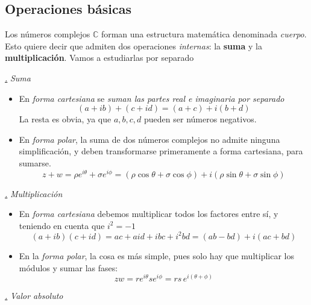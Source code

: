 \documentclass[a4paper,11pt]{book} %
\numberwithin{equation}{chapter}
\def\subsubiContadorIt{\par\addtocounter{subsubsection}{1}\underline{\it\thesubsubsection.}\hskip0.5cm \setcounter{subsubsubsectionIt}{0}}
\newcommand{\SubsubiIt}[1]{
		\subsubiContadorIt \textit{#1}
	}
\newcounter{subsubsubsectionIt}[subsubsection]
\begin{document}
			
		\subsection{Operaciones básicas}

Los números complejos ${\mathbb C}$ forman una estructura matemática denominada \textit{cuerpo}. Esto  quiere decir que admiten dos operaciones \textit{internas}: la \textbf{suma} y la \textbf{multiplicación}. Vamos a estudiarlas por separado


			\SubsubiIt{Suma}

\begin{itemize}
	\item En \textit{forma cartesiana} se \textit{suman las partes real e imaginaria por separado}
	\begin{equation}
(a + i b) + (c + i d) = (a+c) + i (b+d)
	\end{equation} 
La resta es obvia, ya que $a,b,c,d$ pueden ser números negativos. 	

	\item En  \textit{forma polar}, la suma de dos números complejos no admite ninguna simplificación, y deben transformarse primeramente a forma cartesiana, para sumarse. 
	\begin{equation}
z + w = \rho e^{i\theta} + \sigma e^{i\phi} = (\rho\cos\theta + \sigma\cos\phi) + i(\rho\sin\theta +  \sigma\sin\phi) 
	\end{equation}	
\end{itemize}
			
			\SubsubiIt{Multiplicación}

\begin{itemize}
	\item En \textit{forma cartesiana} debemos multiplicar todos los factores entre sí, y teniendo en cuenta que $i^2= -1$
	\begin{equation}
(a + i b) (c + i d) =ac +  ai d +i bc +i^2 bd = (ab - bd) + i(ac + bd)
	\end{equation} 

	\item En la \textit{forma polar}, la cosa es más simple, pues solo hay que multiplicar los módulos y sumar las fases: 
	\begin{equation}
z w = r e^{i\theta} s e^{i\phi} = rs\,   e^{i(\theta + \phi)} 
	\end{equation}
\end{itemize}

			\SubsubiIt{Valor absoluto}
\end{document}

